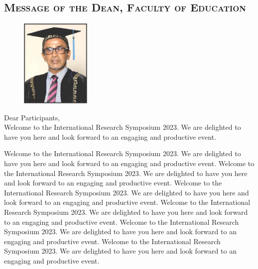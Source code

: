 \thispagestyle{fancy}
	
	\vspace{-2em} %
	\begin{center}



\subsection*{\textsc{Message of the Dean, Faculty of Education}}
	\end{center}

   
    
    \begin{figure}
		\includegraphics[width=0.3\textwidth]{Images/DeanFE.jpeg}
	\end{figure}
	\vspace{2em} %
	
	\noindent	Dear Participants,\\
	
	\noindent
	Welcome to the International Research Symposium 2023. We are delighted to have you here and look forward to an engaging and productive event. 
	
	Welcome to the International Research Symposium 2023. We are delighted to have you here and look forward to an engaging and productive event. Welcome to the International Research Symposium 2023. We are delighted to have you here and look forward to an engaging and productive event. Welcome to the International Research Symposium 2023. We are delighted to have you here and look forward to an engaging and productive event. Welcome to the International Research Symposium 2023. We are delighted to have you here and look forward to an engaging and productive event. Welcome to the International Research Symposium 2023. We are delighted to have you here and look forward to an engaging and productive event. Welcome to the International Research Symposium 2023. We are delighted to have you here and look forward to an engaging and productive event. 
	

